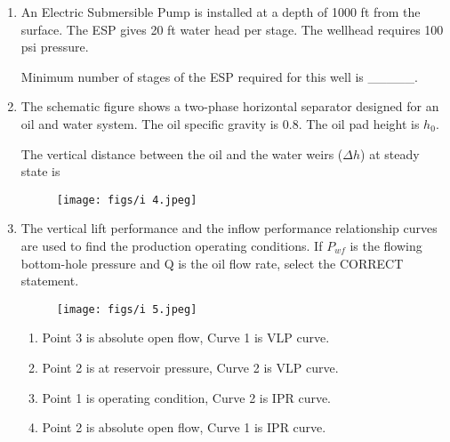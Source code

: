 \documentclass[journal]{IEEEtran}
\begin{document}
\begin{enumerate}
    \item An Electric Submersible Pump  is installed at a depth of 1000 ft from the surface. The ESP gives 20 ft water head per stage. The wellhead requires 100 psi pressure.
    
    Minimum number of stages of the ESP required for this well is \_\_\_\_\_.
    
    \hfill{}
    
    \item The schematic figure shows a two-phase horizontal separator designed for an oil and water system. The oil specific gravity is 0.8. The oil pad height is $h_0$.
    
    The vertical distance between the oil and the water weirs ($\Delta h$) at steady state is
    \begin{figure}
        \centering
        \texttt{[image: figs/i 4.jpeg]}
        \caption{}
        \label{fig:placeholder}
    \end{figure}
 
    
    \begin{enumerate}  \end{enumerate}              
    
    \hfill{}
    
    \item The vertical lift performance  and the inflow performance relationship  curves are used to find the production operating conditions. If $P_{wf}$ is the flowing bottom-hole pressure and Q is the oil flow rate, select the CORRECT statement.
    \begin{figure}
        \centering
        \texttt{[image: figs/i 5.jpeg]}
        \caption{}
        \label{fig:placeholder}
    \end{figure}
    
    
    \begin{enumerate}               
        \item Point 3 is absolute open flow, Curve 1 is VLP curve.
        \item Point 2 is at reservoir pressure, Curve 2 is VLP curve.
        \item Point 1 is operating condition, Curve 2 is IPR curve.
        \item Point 2 is absolute open flow, Curve 1 is IPR curve.
 \end{enumerate}              
    

\end{enumerate}
\end{document}
